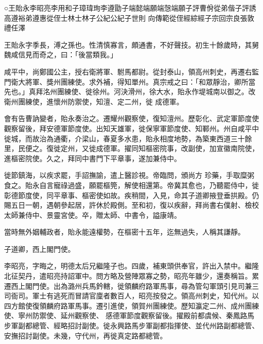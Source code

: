 
\begin{pinyinscope}

 ○王貽永李昭亮李用和子璋瑋珣李遵勖子端懿端願端愨端願子評曹佾從弟偕子評誘高遵裕弟遵惠從侄士林士林子公紀公紀子世則
 向傳範從侄經綜經子宗回宗良張敦禮任澤



 王貽永字季長，溥之孫也。性清慎寡言，頗通書，不好聲技。初生十餘歲時，其舅魏咸信見而奇之，曰：「後當類我。」



 咸平中，尚鄭國公主，授右衛將軍、駙馬都尉。從封泰山，領高州刺史，再遷右監門衛大將軍、獎州團練使。求外補，得知單州。真宗戒之曰：「和眾靜治，卿所當先也。」真拜洺州團練使、徙徐州。河決滑州，徐大水，貽永作堤城南以御之。改衛州團練使，進懷州防禦使，知澶、定二州，徙
 成德軍。



 會有告曹訥變者，貽永奏治之。遷耀州觀察使，復知澶州。歷彰化、武定軍節度使觀察留後，拜安德軍節度使。出知天雄軍，徙保寧軍節度使、知鄆州。州自咸平中徙城，而故治為通衢，介梁山，春夏多水患，貽永相度地勢，為築東西道三十餘里，民便之。復徙定州，又徙成德軍。擢同知樞密院事，改副使，加宣徽南院使，進樞密院使。久之，拜同中書門下平章事，遂加兼侍中。



 徙節鎮海，以疾求罷，手詔撫諭，遣上醫診視。帝臨問，頒尚方
 珍藥，手取糜粥食之。貽永自言寵祿過盛，願罷樞筦，解使相還第。帝冀其愈也，乃聽罷侍中，徙彰德節度使，同平章事、樞密使如故。疾稍間，入見，命其子道卿掖登垂拱殿。仍賜五日一朝，遇朝參起居，許休於殿側。至和初，復以疾辭，拜尚書右僕射、檢校太師兼侍中、景靈宮使。卒，贈太師、中書令，謚康靖。



 當時無外姻輔政者，貽永能遠權勢，在樞密十五年，迄無過失，人稱其謙靜。



 子道卿，西上閣門使。



 李昭亮，字晦之，明德太后兄繼隆子也。四歲，補東頭供奉官，許出入禁中。繼隆北征契丹，遣昭亮持詔軍中。問方略及營陣眾寡之勢，昭亮年雖少，還奏稱旨。累遷西上閣門使。出為潞州兵馬鈐轄，徙領麟府路軍馬事，尋為管勾軍頭引見司兼三司衙司。軍士有逃死而冒請官廩者數百人，昭亮按發之。領高州刺史，知代州。以四方館使復領麟府路軍馬事。遷引進使，領賀州團練使。歷知瀛定二州、成州團練使、寧州防禦使、延州觀察使、
 感德軍節度觀察留後。擢殿前都虞候、秦鳳路馬步軍副都總管、經略招討副使。徙永興路馬步軍副都指揮使、並代州路副都總管、安撫招討副使。未幾，守代州，再徙真定路都總管。




\end{pinyinscope}
